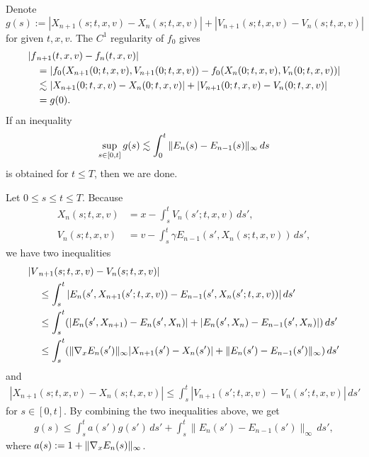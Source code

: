 \documentclass[11pt]{amsart}
\begin{document}
\begin{pfs}
\item
Denote
\[g(s):=|X_{n+1}(s;t,x,v)-X_n(s;t,x,v)|+|V_{n+1}(s;t,x,v)-V_n(s;t,x,v)|\]
for given $t,x,v$.
The $C^1$ regularity of $f_0$ gives
\begin{align*}
|f&_{n+1}(t,x,v)-f_n(t,x,v)|\\
&=|f_0(X_{n+1}(0;t,x,v),V_{n+1}(0;t,x,v))-f_0(X_n(0;t,x,v),V_n(0;t,x,v))|\\
&\lesssim|X_{n+1}(0;t,x,v)-X_n(0;t,x,v)|+|V_{n+1}(0;t,x,v)-V_n(0;t,x,v)|\\
&=g(0).
\end{align*}
If an inequality
\[\sup_{s\in[0,t]}g(s)\lesssim\int_0^t\|E_n(s)-E_{n-1}(s)\|_\infty\,ds\]
is obtained for $t\le T$, then we are done.

Let $0\le s\le t\le T$.
Because
\begin{align*}
X_n(s;t,x,v)&=x-\int_s^tV_n(s';t,x,v)\,ds',\\
V_n(s;t,x,v)&=v-\int_s^t\gamma E_{n-1}(s',X_n(s;t,x,v))\,ds',
\end{align*}
we have two inequalities
\begin{align*}
|V&_{n+1}(s;t,x,v)-V_n(s;t,x,v)|\\
&\le\int_s^t|E_n(s',X_{n+1}(s';t,x,v))-E_{n-1}(s',X_n(s';t,x,v))|\,ds'\\
&\le\int_s^t(|E_n(s',X_{n+1})-E_n(s',X_n)|+|E_n(s',X_n)-E_{n-1}(s',X_n)|)\,ds'\\
&\le\int_s^t(\|\nabla_xE_n(s')\|_\infty|X_{n+1}(s')-X_n(s')|+\|E_n(s')-E_{n-1}(s')\|_\infty)\,ds'
\end{align*}
and
\begin{align*}
|X_{n+1}(s;t,x,v)-X_n(s;t,x,v)|\le\int_s^t|V_{n+1}(s';t,x,v)-V_n(s';t,x,v)|\,ds'
\end{align*}
for $s\in[0,t]$.
By combining the two inequalities above, we get
\begin{align}\label{ggw}
g(s)\le\int_s^ta(s')g(s')\,ds'+\int_s^t\|E_n(s')-E_{n-1}(s')\|_\infty\,ds',
\end{align}
where $a(s):=1+\|\nabla_xE_n(s)\|_\infty$.


\end{pfs}
\end{document}
